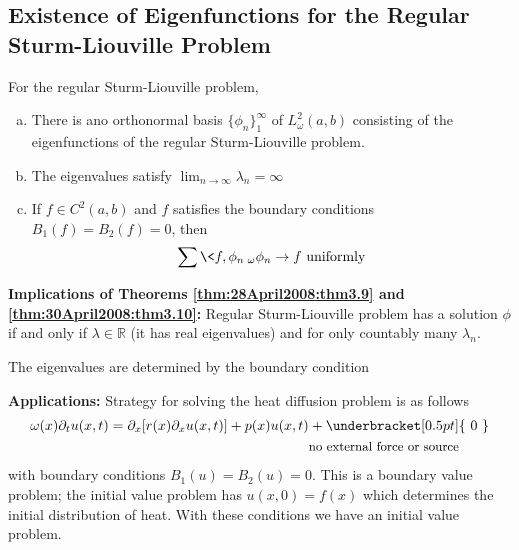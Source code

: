 \subsection[Existence Theorem for Sturm-Liouville]{Existence of Eigenfunctions for the Regular Sturm-Liouville Problem}

\begin{thm}\label{thm:30April2008:thm3.10}
For the regular Sturm-Liouville problem,
\begin{enumerate}[a)]
\item There is ano orthonormal basis $\{\phi_n\}^{\infty}_{1}$ of
$L^{2}_{\omega}(a,b)$ consisting of the eigenfunctions of
the regular Sturm-Liouville problem.
\item The eigenvalues satisfy  $\lim_{n\to\infty}\lambda_{n}=\infty$
\item If $f\in C^{2}(a,b)$ and $f$ satisfies the boundary
  conditions $B_1(f)=B_2(f)=0$, then
\begin{equation*}
\sum\<f,\phi_n\>_{\omega}\phi_{n}\to f\text{  uniformly}
\end{equation*}
\end{enumerate}
\end{thm}

\textbf{Implications of Theorems \eqref{thm:28April2008:thm3.9} and \eqref{thm:30April2008:thm3.10}:}
Regular Sturm-Liouville problem has a solution $\phi$ if and
only if $\lambda\in\mathbb{R}$ (it has real eigenvalues) and
for only countably many $\lambda_{n}$.

\begin{rmk}
The eigenvalues are determined by the boundary condition
\end{rmk}

\textbf{Applications:} Strategy for solving the heat
diffusion problem is as follows
\begin{align}
\omega(x)\partial_{t}u(x,t) =
\partial_{x}[r(x)\partial_{x}u(x,t)] + p(x)u(x,t) &+
\underbracket[0.5pt]{\text{ 0 }} \\
 & {\text{\small{no external force or source}}} \nonumber
\end{align}
with boundary conditions $B_{1}(u)=B_{2}(u)=0$. This is a
boundary value problem; the initial value problem has
$u(x,0)=f(x)$ which determines the initial distribution of
heat. With these conditions we have an initial value
problem.

